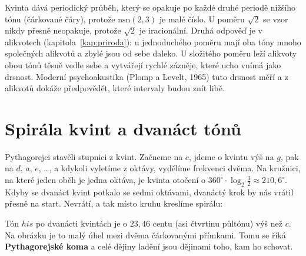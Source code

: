 Kvinta dává periodický průběh, který se opakuje po každé druhé periodě nižšího tónu (čárkované čáry), protože $\mathrm{nsn}(2, 3)$ je malé číslo. U poměru $\sqrt{2}$ se vzor nikdy přesně neopakuje, protože $\sqrt{2}$ je iracionální. Druhá odpověď je v alikvotech (kapitola~\ref{kap:priroda}): u jednoduchého poměru mají oba tóny mnoho společných alikvotů a zbylé jsou od sebe daleko. U složitého poměru leží alikvoty obou tónů těsně vedle sebe a vytvářejí rychlé zázněje, které ucho vnímá jako drsnost. Moderní psychoakustika (Plomp a Levelt, 1965) tuto drsnost měří a z alikvotů dokáže předpovědět, které intervaly budou znít libě.

\section{Spirála kvint a dvanáct tónů}

Pythagorejci stavěli stupnici z kvint. Začneme na $c$, jdeme o kvintu výš na $g$, pak na $d$, $a$, $e$, \dots, a kdykoli vyletíme z oktávy, vydělíme frekvenci dvěma. Na kružnici, na které jeden oběh je jedna oktáva, je kvinta otočení o $360^\circ\cdot\log_2\frac{3}{2}\approx 210{,}6^\circ$. Kdyby se dvanáct kvint potkalo se sedmi oktávami, dvanáctý krok by nás vrátil přesně na start. Nevrátí, a tak místo kruhu kreslíme spirálu:

\begin{center}
\end{center}

Tón $his$ po dvanácti kvintách je o $23{,}46$ centu (asi čtvrtinu půltónu) výš než $c$. Na obrázku je to malý úhel mezi dvěma čárkovanými přímkami. Tomu se říká \textbf{Pythagorejské koma} a celé dějiny ladění jsou dějinami toho, kam ho schovat.

